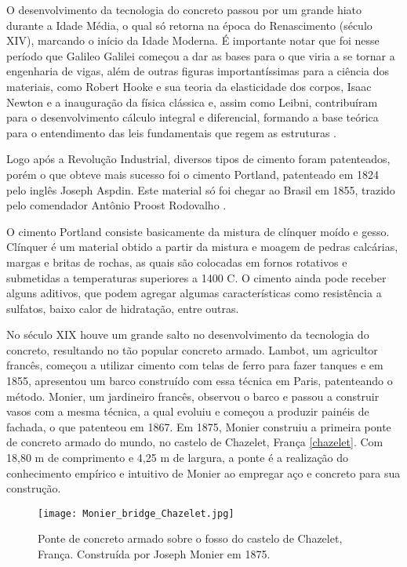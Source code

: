 O desenvolvimento da tecnologia do concreto passou por um grande hiato durante a Idade Média, o qual só retorna na época do Renascimento (século XIV), marcando o início da Idade Moderna. É importante notar que foi nesse período que Galileo Galilei começou a dar as bases para o que viria a se tornar a engenharia de vigas, além de outras figuras importantíssimas para a ciência dos materiais, como Robert Hooke e sua teoria da elasticidade dos corpos, Isaac Newton e a inauguração da física clássica e, assim como Leibni, contribuíram para o desenvolvimento cálculo integral e diferencial, formando a base teórica para o entendimento das leis fundamentais que regem as estruturas \cite{Isaia}.

Logo após a Revolução Industrial, diversos tipos de cimento foram patenteados, porém o que obteve mais sucesso foi o cimento Portland, patenteado em 1824 pelo inglês Joseph Aspdin. Este material só foi chegar ao Brasil em 1855, trazido pelo comendador Antônio Proost Rodovalho \cite{Isaia}.

O cimento Portland consiste basicamente da mistura de clínquer moído e gesso. Clínquer é um material obtido a partir da mistura e moagem de pedras calcárias, margas e britas de rochas, as quais são colocadas em fornos rotativos e submetidas a temperaturas superiores a 1400\textsuperscript{\degree} C. O cimento ainda pode receber alguns aditivos, que podem agregar algumas características como resistência a sulfatos, baixo calor de hidratação, entre outras.

No século XIX houve um grande salto no desenvolvimento da tecnologia do concreto, resultando no tão popular concreto armado. Lambot, um agricultor francês, começou a utilizar cimento com telas de ferro para fazer tanques e em 1855, apresentou um barco construído com essa técnica em Paris, patenteando o método. Monier, um jardineiro francês, observou o barco e passou a construir vasos com a mesma técnica, a qual evoluiu e começou a produzir painéis de fachada, o que patenteou em 1867. Em 1875, Monier construiu a primeira ponte de concreto armado do mundo, no castelo de Chazelet, França \autoref{chazelet}. Com 18,80 m de comprimento e 4,25 m de largura, a ponte é a realização do conhecimento empírico e intuitivo de Monier ao empregar aço e concreto para sua construção.

\begin{figure}[htb]
	\caption{\label{chazelet}Ponte de concreto armado sobre o fosso do castelo de Chazelet, França. Construída por Joseph Monier em 1875.}
	\begin{center}
		\texttt{[image: Monier\_bridge\_Chazelet.jpg]}
	\end{center}
\end{figure}


